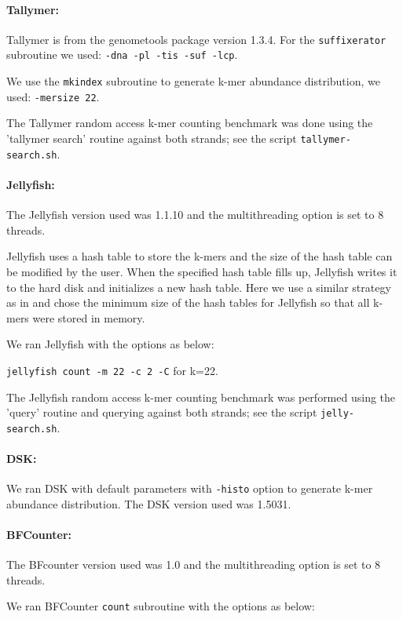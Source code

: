 \paragraph{Tallymer:}
Tallymer is from the genometools package version 1.3.4. For the {\tt suffixerator} subroutine 
we used:
{\tt -dna -pl -tis -suf -lcp}.

We use the {\tt mkindex} subroutine to generate k-mer abundance distribution, we used:
{\tt -mersize 22}.

The Tallymer random access k-mer counting benchmark was done using the
'tallymer search' routine against both strands; see the script
{\tt tallymer-search.sh}.

\paragraph{Jellyfish:}
The Jellyfish version used was 1.1.10 and the multithreading option is set to 8 threads.

Jellyfish uses a hash table to store the k-mers and the size of the
hash table can be modified by the user.  When the specified hash table
fills up, Jellyfish writes it to the hard
disk and initializes a new hash table.  Here we use a
similar strategy as in \cite{Melsted2011} and chose the minimum size of the hash 
tables for Jellyfish so that all k-mers were stored in memory.

We ran Jellyfish with the options as below:

{\tt jellyfish count -m 22 -c 2 -C} for k=22.


The Jellyfish random access k-mer counting benchmark was performed
using the 'query' routine and querying against both strands; see
the script {\tt jelly-search.sh}.

\paragraph{DSK:} We ran DSK with default parameters with {\tt -histo} option to generate
k-mer abundance distribution. The DSK version used was 1.5031.

\paragraph{BFCounter:} The BFcounter version used was 1.0 and the multithreading option is set to 8
 threads.
 
We ran BFCounter {\tt count} subroutine with the options as below:
 
